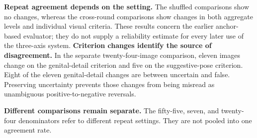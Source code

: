 \textbf{Repeat agreement depends on the setting.} The shuffled comparisons show no changes, whereas the cross-round comparisons show changes in both aggregate levels and individual visual criteria. These results concern the earlier anchor-based evaluator; they do not supply a reliability estimate for every later use of the three-axis system.
\newpage
\textbf{Criterion changes identify the source of disagreement.} In the separate twenty-four-image comparison, eleven images change on the genital-detail criterion and five on the suggestive-pose criterion. Eight of the eleven genital-detail changes are between uncertain and false. Preserving uncertainty prevents those changes from being misread as unambiguous positive-to-negative reversals.

\textbf{Different comparisons remain separate.} The fifty-five, seven, and twenty-four denominators refer to different repeat settings. They are not pooled into one agreement rate.

